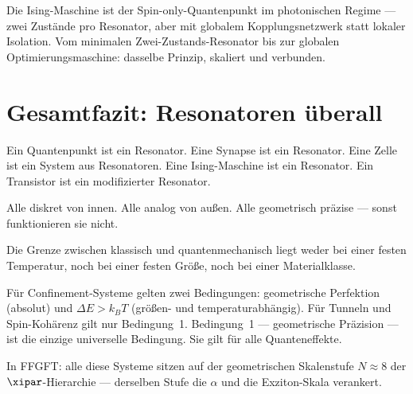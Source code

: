 \begin{center}
\end{center}

Die Ising-Maschine ist der Spin-only-Quantenpunkt im photonischen
Regime --- zwei Zustände pro Resonator, aber mit globalem
Kopplungsnetzwerk statt lokaler Isolation.
Vom minimalen Zwei-Zustands-Resonator bis zur globalen
Optimierungsmaschine: dasselbe Prinzip, skaliert und verbunden.

\section{Gesamtfazit: Resonatoren überall}
\label{sec:fazit}

\begin{conclusionBox}[Fazit]
Ein Quantenpunkt ist ein Resonator.
Eine Synapse ist ein Resonator.
Eine Zelle ist ein System aus Resonatoren.
Eine Ising-Maschine ist ein Resonator.
Ein Transistor ist ein modifizierter Resonator.

Alle diskret von innen. Alle analog von außen.
Alle geometrisch präzise --- sonst funktionieren sie nicht.

Die Grenze zwischen klassisch und quantenmechanisch liegt
weder bei einer festen Temperatur, noch bei einer festen Größe,
noch bei einer Materialklasse.

Für Confinement-Systeme gelten zwei Bedingungen:
geometrische Perfektion (absolut) und $\Delta E > k_BT$
(größen- und temperaturabhängig).
Für Tunneln und Spin-Kohärenz gilt nur Bedingung~1.
Bedingung~1 --- geometrische Präzision --- ist die einzige
universelle Bedingung. Sie gilt für alle Quanteneffekte.

In FFGFT: alle diese Systeme sitzen auf der geometrischen
Skalenstufe $N \approx 8$ der $\xipar$-Hierarchie ---
derselben Stufe die $\alpha$ und die Exziton-Skala verankert.
\end{conclusionBox}

